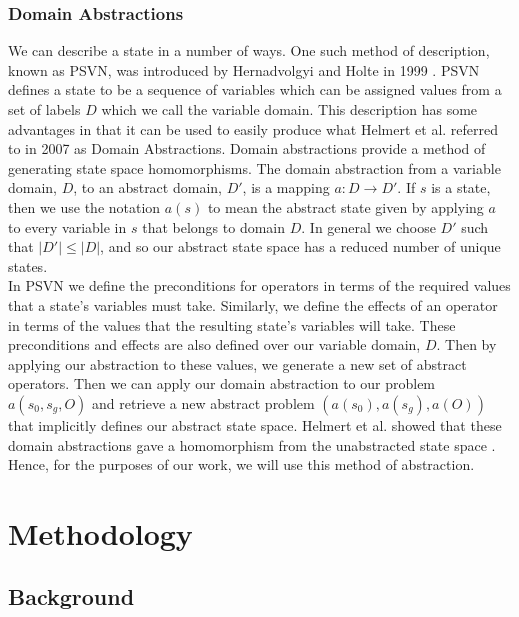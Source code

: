 \documentclass{article}
\begin{document}
\subsubsection*{Domain Abstractions}

We can describe a state in a number of ways.
One such method of description, known as PSVN, was introduced by
Hernadvolgyi and Holte in 1999 \cite{hernadvolgyi1999psvn}.
PSVN defines a state to be a sequence of variables
which can be assigned values from a set of labels \(D\) which we call the
variable domain. This description has some advantages in that it
can be used to easily produce what Helmert et al. referred to in 2007 \cite{helmert2007flexible} as Domain Abstractions.
Domain abstractions provide a method of generating state space homomorphisms.
The domain abstraction from a variable domain, \(D\), to an abstract domain, \(D'\),
is a mapping \(a : D \rightarrow D'\).
If \(s\) is a state, then we use the notation \(a(s)\) to mean the abstract state
given by applying \(a\) to every variable in \(s\) that belongs to domain \(D\).
In general we choose \(D'\) such that \(|D'| \leq |D|\), and so our abstract state space has a reduced
number of unique states. \\

In PSVN we define the preconditions for operators in terms of the required values
that a state's variables must take. Similarly, we define the effects of an operator
in terms of the values that the resulting state's variables will take. These preconditions
and effects are also defined over our variable domain, \(D\). Then by applying our
abstraction to these values, we generate a new set of abstract operators.
Then we can apply our domain abstraction to our problem \(a(s_0, s_g, O)\) and
retrieve a new abstract problem \((a(s_0), a(s_g), a(O))\) that implicitly
defines our abstract state space. Helmert et al. showed that these domain abstractions
gave a homomorphism from the unabstracted state space \cite{helmert2007flexible}.
Hence, for the purposes of our work, we will use this method of abstraction. \\


\section{Methodology}

\subsection{Background}
\end{document}
